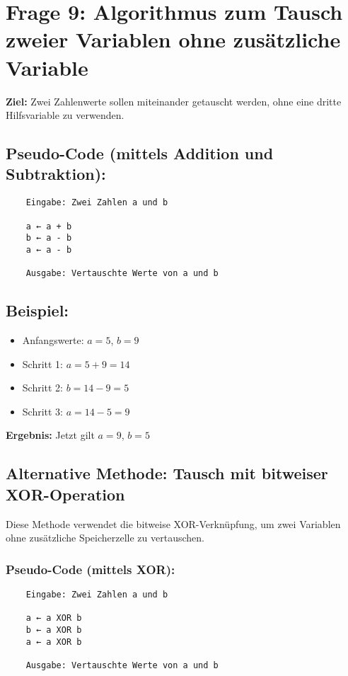 \documentclass{article}
\begin{document}
\section*{Frage 9: Algorithmus zum Tausch zweier Variablen ohne zusätzliche Variable}

\textbf{Ziel:} Zwei Zahlenwerte sollen miteinander getauscht werden, ohne eine dritte Hilfsvariable zu verwenden.

\subsection*{Pseudo-Code (mittels Addition und Subtraktion):}

\begin{verbatim}
	Eingabe: Zwei Zahlen a und b
	
	a ← a + b
	b ← a - b
	a ← a - b
	
	Ausgabe: Vertauschte Werte von a und b
\end{verbatim}

\subsection*{Beispiel:}
\begin{itemize}
	\item Anfangswerte: \( a = 5 \), \( b = 9 \)
	\item Schritt 1: \( a = 5 + 9 = 14 \)
	\item Schritt 2: \( b = 14 - 9 = 5 \)
	\item Schritt 3: \( a = 14 - 5 = 9 \)
\end{itemize}

\textbf{Ergebnis:} Jetzt gilt \( a = 9 \), \( b = 5 \)


\subsection*{Alternative Methode: Tausch mit bitweiser XOR-Operation}

Diese Methode verwendet die bitweise XOR-Verknüpfung, um zwei Variablen ohne zusätzliche Speicherzelle zu vertauschen.

\subsubsection*{Pseudo-Code (mittels XOR):}

\begin{verbatim}
	Eingabe: Zwei Zahlen a und b
	
	a ← a XOR b
	b ← a XOR b
	a ← a XOR b
	
	Ausgabe: Vertauschte Werte von a und b
\end{verbatim}
\end{document}
